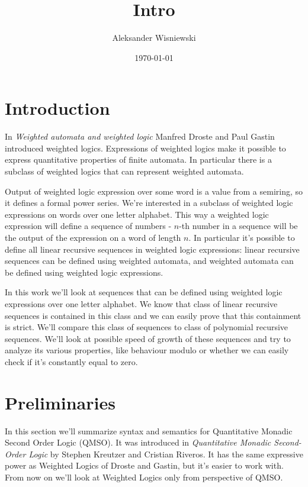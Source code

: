 \documentclass[12pt]{article}
\title{Intro}
\author{Aleksander Wisniewski}
\date{\today}
\newcommand{\ifilip}[1]{\todo[inline,color=green!10]{{\bf Filip:} #1}}
\theoremstyle{definition}
\begin{document}
\maketitle

\ifilip{Filip: Intro, sekcja 3}

\section{Introduction}
In \textit{Weighted automata and weighted logic} Manfred Droste and Paul Gastin introduced weighted logics. Expressions of weighted logics make it possible to express quantitative properties of finite automata. In particular there is a subclass of weighted logics that can represent weighted automata. 

Output of weighted logic expression over some word is a value from a semiring, so it defines a formal power series. We're interested in a subclass of weighted logic expressions on words over one letter alphabet. This way a weighted logic expression will define a sequence of numbers - $n$-th number in a sequence will be the output of the expression on a word of length $n$. In particular it's possible to define all linear recursive sequences in weighted logic expressions: linear recursive sequences can be defined using weighted automata, and weighted automata can be defined using weighted logic expressions.

In this work we'll look at sequences that can be defined using weighted logic expressions over one letter alphabet. We know that class of linear recursive sequences is contained in this class and we can easily prove that this containment is strict. We'll compare this class of sequences to class of polynomial recursive sequences. We'll look at possible speed of growth of these sequences and try to analyze its various properties, like behaviour modulo or whether we can easily check if it's constantly equal to zero.

\section{Preliminaries}
In this section we'll summarize syntax and semantics for Quantitative Monadic Second Order Logic (QMSO). It was introduced in \textit{Quantitative Monadic Second-Order Logic} by Stephen Kreutzer and Cristian Riveros. It has the same expressive power as Weighted Logics of Droste and Gastin, but it's easier to work with. From now on we'll look at Weighted Logics only from perspective of QMSO.
\end{document}
